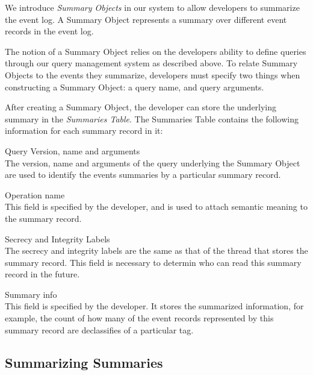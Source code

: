 We introduce \emph{Summary Objects} in our system to allow developers to summarize the event log. A Summary Object represents a summary over different event records in the event log.

The notion of a Summary Object relies on the developers ability to define queries through our query management system as described above. To relate Summary Objects to the events they summarize, developers must specify two things when constructing a Summary Object: a query name, and query arguments.

After creating a Summary Object, the developer can store the underlying summary in the \emph{Summaries Table}. The Summaries Table contains the following information for each summary record in it:

\begin{description}
  \item{Query Version, name and arguments} \ \\
    The version, name and arguments of the query underlying the Summary Object 
    are used to identify the events summaries by a particular summary record.
  \item{Operation name} \ \\
    This field is specified by the developer, and is used to attach semantic meaning
    to the summary record.
  \item{Secrecy and Integrity Labels} \ \\
    The secrecy and integrity labels are the same as that of the thread that stores
    the summary record. This field is necessary to determin who can read this 
    summary record in the future.
  \item{Summary info} \ \\
    This field is specified by the developer. It stores the summarized information,
    for example, the count of how many of the event records represented by this 
    summary record are declassifies of a particular tag.
\end{description}

\subsection{Summarizing Summaries}


